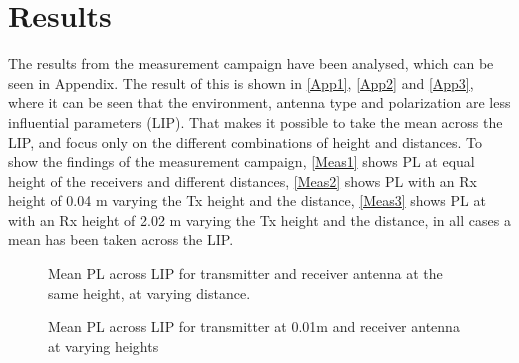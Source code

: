 \section{Results}
The results from the measurement campaign have been analysed, which can be seen in Appendix. The result of this is shown in \autoref{App1}, \autoref{App2} and \autoref{App3}, where it can be seen that the environment, antenna type and polarization are less influential parameters (LIP). %
That makes it possible to take the mean across the LIP, and focus only on the different combinations of height and distances. To show the findings of the measurement campaign, \autoref{Meas1} shows PL at equal height of the receivers and different distances, \autoref{Meas2} shows PL with an Rx height of 0.04 m varying the Tx height and the distance, \autoref{Meas3} shows PL at with an Rx height of 2.02 m varying the Tx height and the distance, in all cases a mean has been taken across the LIP. 





\begin{figure}[!htbp]
\centering

\caption{Mean PL across LIP for transmitter and receiver antenna at the same height, at varying distance.}
\label{Meas1}
\end{figure}

\begin{figure}[!htbp]
\centering

\caption{Mean PL across LIP for transmitter at 0.01m and receiver antenna at varying heights}
\label{Meas2}
\end{figure}

